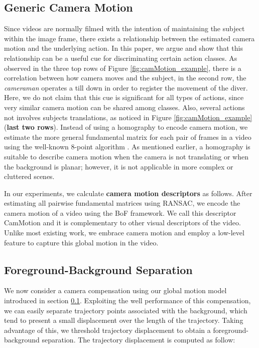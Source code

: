 \subsection{Generic Camera Motion}
\label{subsec:cam_motion}
Since videos are normally filmed with the intention of maintaining the subject within the image frame, there exists a relationship between the estimated camera motion and the underlying action. In this paper, we argue and show that this relationship can be a useful cue for discriminating certain action classes. As observed in the three top rows of Figure \ref{fig:camMotion_example}, there is a correlation between how camera moves and the subject, \eg in the second row, the \textit{cameraman} operates a till down in order to register the movement of the diver. Here, we do not claim that this cue is significant for all types of actions, since very similar camera motion can be shared among classes. Also, several actions not involves subjects translations, as noticed in Figure \ref{fig:camMotion_example} (\textbf{last two rows}). Instead of using a homography to encode camera motion, we estimate the more general fundamental matrix for each pair of frames in a video using the well-known 8-point algorithm \cite{eightpoint97}. As mentioned earlier, a homography is suitable to describe camera motion when the camera is not translating or when the background is planar; however, it is not applicable in more complex or cluttered scenes.

In our experiments, we calculate \textbf{camera motion descriptors} as follows. After estimating all pairwise fundamental matrices using RANSAC, we encode the camera motion of a video using the BoF framework. We call this descriptor CamMotion and it is complementary to other visual descriptors of the video. Unlike most existing work, we embrace camera motion and employ a low-level feature to capture this global motion in the video.



\subsection{Foreground-Background Separation}
We now consider a camera compensation using our global motion model introduced in section \ref{subsec:cam_motion}. Exploiting the well performance of this compensation, we can easily separate trajectory points associated with the background, which tend to present a small displacement over the length of the trajectory. Taking advantage of this, we threshold trajectory displacement to obtain a foreground-background separation. The trajectory displacement is computed as follow:

